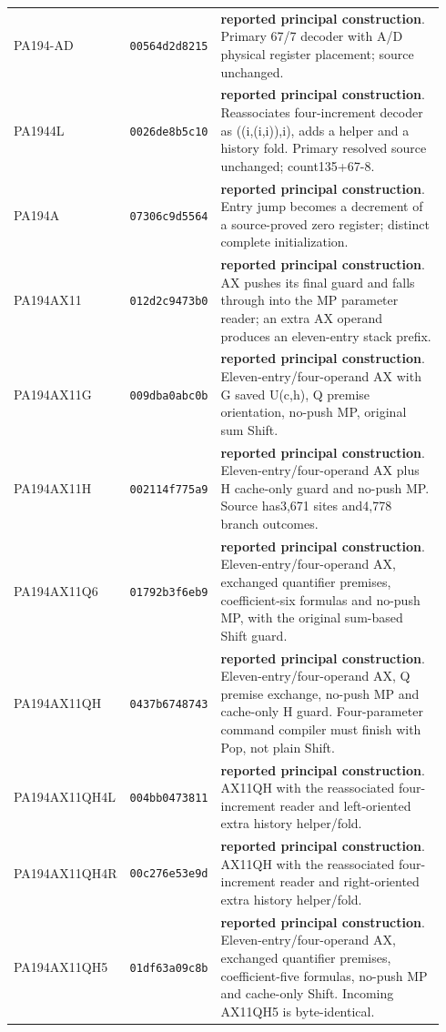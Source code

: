 {\begin{longtable}{@{}>{\raggedright\arraybackslash}p{0.23\linewidth}>{\raggedright\arraybackslash}p{0.145\linewidth}>{\raggedright\arraybackslash}p{0.56\linewidth}@{}}
PA194-AD & \texttt{00564d2d8215} & \textbf{reported principal construction}. Primary 67/7 decoder with A/D physical register placement; source unchanged.\\[4pt]
PA1944L & \texttt{0026de8b5c10} & \textbf{reported principal construction}. Reassociates four-increment decoder as ((i,(i,i)),i), adds a helper and a history fold. Primary resolved source unchanged; count135+67-8.\\[4pt]
PA194A & \texttt{07306c9d5564} & \textbf{reported principal construction}. Entry jump becomes a decrement of a source-proved zero register; distinct complete initialization.\\[4pt]
PA194AX11 & \texttt{012d2c9473b0} & \textbf{reported principal construction}. AX pushes its final guard and falls through into the MP parameter reader; an extra AX operand produces an eleven-entry stack prefix.\\[4pt]
PA194AX11G & \texttt{009dba0abc0b} & \textbf{reported principal construction}. Eleven-entry/four-operand AX with G saved U(c,h), Q premise orientation, no-push MP, original sum Shift.\\[4pt]
PA194AX11H & \texttt{002114f775a9} & \textbf{reported principal construction}. Eleven-entry/four-operand AX plus H cache-only guard and no-push MP. Source has3,671 sites and4,778 branch outcomes.\\[4pt]
PA194AX11Q6 & \texttt{01792b3f6eb9} & \textbf{reported principal construction}. Eleven-entry/four-operand AX, exchanged quantifier premises, coefficient-six formulas and no-push MP, with the original sum-based Shift guard.\\[4pt]
PA194AX11QH & \texttt{0437b6748743} & \textbf{reported principal construction}. Eleven-entry/four-operand AX, Q premise exchange, no-push MP and cache-only H guard. Four-parameter command compiler must finish with Pop, not plain Shift.\\[4pt]
PA194AX11QH4L & \texttt{004bb0473811} & \textbf{reported principal construction}. AX11QH with the reassociated four-increment reader and left-oriented extra history helper/fold.\\[4pt]
PA194AX11QH4R & \texttt{00c276e53e9d} & \textbf{reported principal construction}. AX11QH with the reassociated four-increment reader and right-oriented extra history helper/fold.\\[4pt]
PA194AX11QH5 & \texttt{01df63a09c8b} & \textbf{reported principal construction}. Eleven-entry/four-operand AX, exchanged quantifier premises, coefficient-five formulas, no-push MP and cache-only Shift. Incoming AX11QH5 is byte-identical.\\[4pt]

\end{longtable}}
